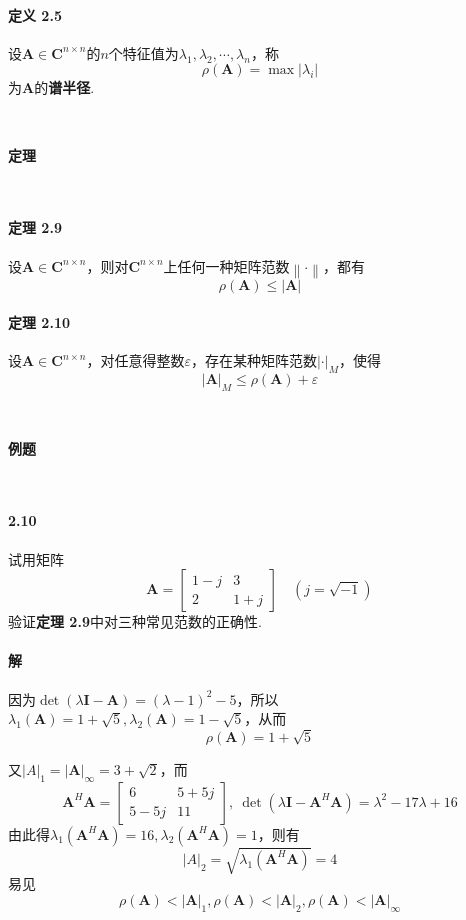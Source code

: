 \documentclass[12pt, a4paper, oneside, fontset=none]{ctexart}
\begin{document}
\paragraph*{定义 2.5} 设$\bm{A} \in \bm{C}^{n\times n}$的$n$个特征值为$\lambda_1,\lambda_2,\cdots,\lambda_n$，称
\[
    \rho(\bm{A}) = \max \left\lvert \lambda_i \right\rvert
\]
为$\bm{A}$的\textbf{谱半径}.

\par \ \par

\centerline{\large{\textbf{定理}}} \ \par

\paragraph*{定理 2.9} 设$\bm{A} \in \bm{C}^{n\times n}$，则对$\bm{C}^{n\times n}$上任何一种矩阵范数$\left\lVert \bm{\cdot} \right\rVert$，都有
\[
    \rho(\bm{A}) \leqslant \left\lvert \bm{A} \right\rvert
\]

\paragraph*{定理 2.10} 设$\bm{A} \in \bm{C}^{n\times n}$，对任意得整数$\varepsilon$，存在某种矩阵范数$\left\lvert \bm{\cdot} \right\rvert _M$，使得
\[
    \left\lvert \bm{A} \right\rvert _M \leqslant \rho(\bm{A}) + \varepsilon
\]

\par \ \par

\centerline{\large{\textbf{例题}}} \ \par

\paragraph*{2.10} 试用矩阵
\[
    \bm{A} = \begin{bmatrix}
        1 - j & 3     \\
        2     & 1 + j
    \end{bmatrix} \quad (j = \sqrt{-1})
\]
验证\textbf{定理 2.9}中对三种常见范数的正确性.

\paragraph*{解} 因为$\det (\lambda\bm{I} - \bm{A}) = (\lambda - 1)^2 - 5$，所以$\lambda_1(\bm{A}) = 1 + \sqrt{5}, \lambda_2(\bm{A}) = 1 - \sqrt{5}$，从而
\[
    \rho(\bm{A}) = 1 + \sqrt{5}
\] \par
又$\left\lvert A \right\rvert _1 = \left\lvert \bm{A} \right\rvert _\infty = 3 + \sqrt{2}$，而
\[
    \bm{A}^H\bm{A} = \begin{bmatrix}
        6      & 5 + 5j \\
        5 - 5j & 11
    \end{bmatrix},\ \det(\lambda\bm{I} - \bm{A}^{H}\bm{A}) = \lambda^2 - 17\lambda + 16
\]
由此得$\lambda_1(\bm{A}^H\bm{A}) = 16, \lambda_2(\bm{A}^H\bm{A}) = 1$，则有
\[
    \left\lvert A \right\rvert _2 = \sqrt{\lambda_1(\bm{A}^H\bm{A})} = 4
\]
易见
\[
    \rho(\bm{A}) < \left\lvert \bm{A} \right\rvert _1,\rho(\bm{A}) < \left\lvert \bm{A} \right\rvert _2,\rho(\bm{A}) < \left\lvert \bm{A} \right\rvert _\infty
\]
\end{document}
